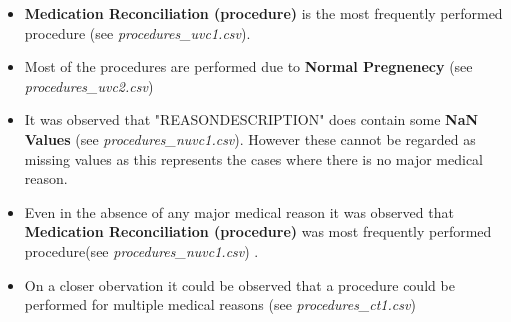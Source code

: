 \documentclass[12pt, twosided]{report}  %
\begin{document}
\begin{itemize}

	\item \textbf{Medication Reconciliation (procedure)} is the most frequently performed procedure (see \textit{procedures\_uvc1.csv}).
	
	\item Most of the procedures are performed due to \textbf{Normal Pregnenecy} (see \textit{procedures\_uvc2.csv})
	
	\item It was observed that "REASONDESCRIPTION" does contain some \textbf{NaN Values} (see \textit{procedures\_nuvc1.csv}). However these cannot be regarded as missing values as this represents the cases where there is no major medical reason.
	
	\item Even in the absence of any major medical reason it was observed that \textbf{Medication Reconciliation (procedure)} was most frequently performed procedure(see \textit{procedures\_nuvc1.csv}) .  
	
	\item On a closer obervation it could be observed that a procedure could be performed for multiple medical reasons (see \textit{procedures\_ct1.csv})
	
\end{itemize} 

%
%
\end{document}
